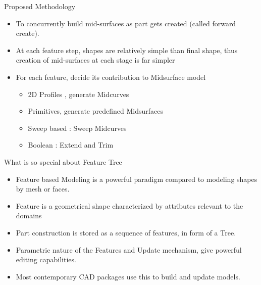 
\begin{frame}{Proposed Methodology}
\begin{itemize}[noitemsep,label=\textbullet,topsep=2pt,parsep=2pt,partopsep=2pt]
\item To concurrently build mid-surfaces as part gets created (called forward create). 
\item At each feature step, shapes are relatively simple than final shape, thus creation of mid-surfaces at each stage is far simpler
\item For each feature, decide its contribution to Midsurface model
	\begin{itemize}[noitemsep,label=\textbullet,topsep=2pt,parsep=2pt,partopsep=2pt]
	\item 2D Profiles , generate Midcurves
	\item Primitives, generate predefined Midsurfaces
	\item Sweep based : Sweep Midcurves
	\item Boolean : Extend and Trim
	\end{itemize}
\end{itemize}
\end{frame}

\begin{frame}{What is so special about Feature Tree}
\begin{itemize}[noitemsep,label=\textbullet,topsep=2pt,parsep=2pt,partopsep=2pt]
\item Feature based Modeling is a powerful paradigm compared to modeling shapes by mesh or faces.
\item Feature is a geometrical shape characterized by attributes relevant to the domains
\item Part construction is stored as a sequence of features, in form of a Tree.
\item Parametric nature of the Features and Update mechanism, give powerful editing capabilities.
\item Most contemporary CAD packages use this to build and update models.
\end{itemize}
\end{frame}

%


